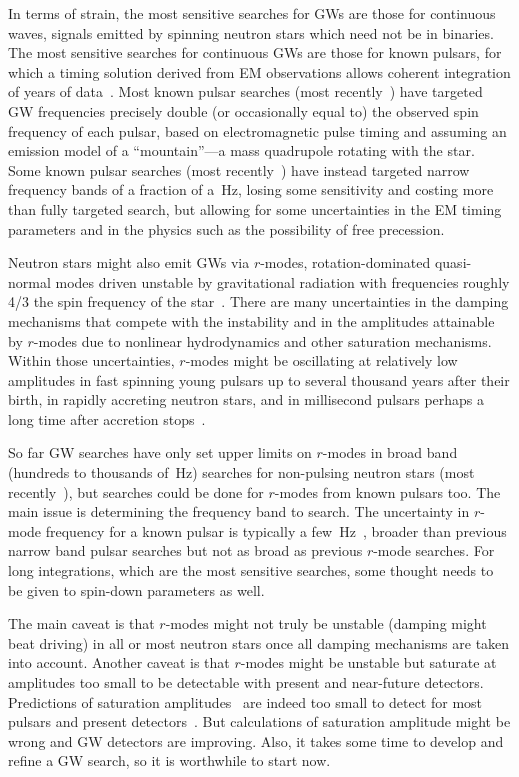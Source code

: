\documentclass{ttuthes2007}
\begin{document}
In terms of strain, the most sensitive searches for \acp{GW} are those for
continuous waves, signals emitted by spinning neutron stars which need not be
in binaries.
The most sensitive searches for continuous \acp{GW} are those for known
pulsars, for which a timing solution derived from \ac{EM} observations
allows coherent integration of years of data~\cite[and references
therein]{Riles:2017evm}.
Most known pulsar searches (most recently~\cite{Authors:2019ztc}) have
targeted \ac{GW} frequencies precisely double (or occasionally equal to) the
observed spin frequency of each pulsar, based on electromagnetic pulse timing
and assuming an emission model of a ``mountain''---a mass quadrupole rotating
with the star.
Some known pulsar searches (most recently~\cite{Abbott:2019bed}) have instead
targeted narrow frequency bands of a fraction of a~Hz, losing some sensitivity
and costing more than fully targeted search, but allowing for some
uncertainties in the \ac{EM} timing parameters and in the physics such as the
possibility of free precession.

Neutron stars might also emit \acp{GW} via $r$-modes, rotation-dominated
quasi-normal modes driven unstable by gravitational radiation with frequencies
roughly 4/3 the spin frequency of the star~\cite[and references
therein]{Paschalidis:2016vmz}.
There are many uncertainties in the damping mechanisms that compete with the
instability and in the amplitudes attainable by $r$-modes due to nonlinear
hydrodynamics and other saturation mechanisms.
Within those uncertainties, $r$-modes might be oscillating at relatively low
amplitudes in fast spinning young pulsars up to several thousand years after
their birth, in rapidly accreting neutron stars, and in millisecond pulsars
perhaps a long time after accretion stops~\cite[and references
therein]{Glampedakis:2017nqy}.

So far \ac{GW} searches have only set upper limits on $r$-modes in broad band
(hundreds to thousands of~Hz) searches for non-pulsing neutron stars (most
recently~\cite{Abbott:2018qee}), but searches could be done for $r$-modes from
known pulsars too.
The main issue is determining the frequency band to search.
The uncertainty in $r$-mode frequency for a known pulsar is typically a
few~Hz~\cite{Idrisy:2014qca}, broader than previous narrow band pulsar
searches but not as broad as previous $r$-mode searches.
For long integrations, which are the most sensitive searches, some thought
needs to be given to spin-down parameters as well.

The main caveat is that $r$-modes might not truly be unstable (damping might
beat driving) in all or most neutron stars once all damping mechanisms are
taken into account.
Another caveat is that $r$-modes might be unstable but saturate at amplitudes
too small to be detectable with present and near-future detectors.
Predictions of saturation amplitudes~\cite{Arras:2002dw} are indeed too small
to detect for most pulsars and present detectors~\cite{Owen:2010ng}.
But calculations of saturation amplitude might be wrong and \ac{GW} detectors
are improving.
Also, it takes some time to develop and refine a \ac{GW} search, so it is
worthwhile to start now.
\end{document}
